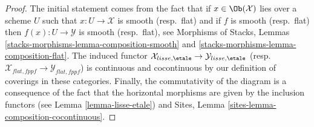 \begin{proof}
The initial statement comes from the fact that if $x \in \Ob(\mathcal{X})$
lies over a scheme $U$ such that $x : U \to \mathcal{X}$ is smooth
(resp.\ flat) and if $f$ is smooth (resp.\ flat) then
$f(x) : U \to \mathcal{Y}$ is smooth (resp.\ flat), see
Morphisms of Stacks, Lemmas \ref{stacks-morphisms-lemma-composition-smooth} and
\ref{stacks-morphisms-lemma-composition-flat}. The induced functor
$\mathcal{X}_{lisse,\etale} \to \mathcal{Y}_{lisse,\etale}$
(resp.\ $\mathcal{X}_{flat,fppf} \to \mathcal{Y}_{flat,fppf}$) is
continuous and cocontinuous by our definition of coverings in these
categories. Finally, the commutativity of the diagram is a consequence of the
fact that the horizontal morphisms are given by the inclusion functors (see
Lemma \ref{lemma-lisse-etale}) and
Sites, Lemma \ref{sites-lemma-composition-cocontinuous}.


\end{proof}
